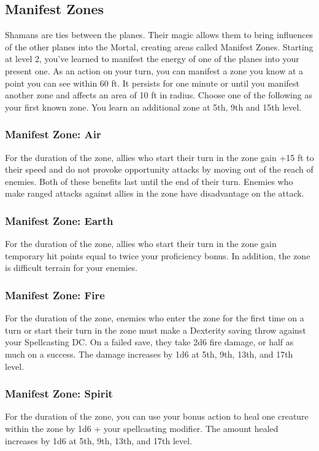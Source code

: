 \subsection{Manifest Zones}
Shamans are ties between the planes. Their magic allows them to bring influences of the other planes into the Mortal, creating areas called Manifest Zones. Starting at level 2, you've learned to manifest the energy of one of the planes into your present one. As an action on your turn, you can manifest a zone you know at a point you can see within 60 ft. It persists for one minute or until you manifest another zone and affects an area of 10 ft in radius. Choose one of the following as your first known zone. You learn an additional zone at 5th, 9th and 15th level.

\subsubsection{Manifest Zone: Air}
For the duration of the zone, allies who start their turn in the zone gain +15 ft to their speed and do not provoke opportunity attacks by moving out of the reach of enemies. Both of these benefits last until the end of their turn. Enemies who make ranged attacks against allies in the zone have disadvantage on the attack.
\subsubsection{Manifest Zone: Earth}
For the duration of the zone, allies who start their turn in the zone gain temporary hit points equal to twice your proficiency bonus. In addition, the zone is difficult terrain for your enemies.
\subsubsection{Manifest Zone: Fire}
For the duration of the zone, enemies who enter the zone for the first time on a turn or start their turn in the zone must make a Dexterity saving throw against your Spellcasting DC. On a failed save, they take 2d6 fire damage, or half as much on a success. The damage increases by 1d6 at 5th, 9th, 13th, and 17th level.
\subsubsection{Manifest Zone: Spirit}
For the duration of the zone, you can use your bonus action to heal one creature within the zone by 1d6 + your spellcasting modifier. The amount healed increases by 1d6 at 5th, 9th, 13th, and 17th level.
